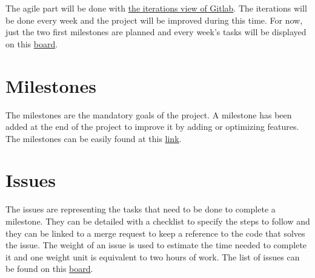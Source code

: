 The agile part will be done with \href{https://gitlab.forge.hefr.ch/ps6-2223-microdoser/ps6-2223-microdoser/-/cadences}{the iterations view of Gitlab}.
The iterations will be done every week and the project will be improved during this time.
For now, just the two first milestones are planned and every week's tasks will be displayed on this \href{https://gitlab.forge.hefr.ch/ps6-2223-microdoser/ps6-2223-microdoser/-/boards/1667?iteration_id=Current}{board}.


\section{Milestones}
\label{sec:planning:milestones}

The milestones are the mandatory goals of the project.
A milestone has been added at the end of the project to improve it by adding or optimizing features.
The milestones can be easily found at this \href{https://gitlab.forge.hefr.ch/ps6-2223-microdoser/ps6-2223-microdoser/-/milestones}{link}.

\section{Issues}
\label{sec:planning:issues}

The issues are representing the tasks that need to be done to complete a milestone.
They can be detailed with a checklist to specify the steps to follow and they can be linked to a merge request to keep a reference to the code that solves the issue.
The weight of an issue is used to estimate the time needed to complete it and one weight unit is equivalent to two hours of work.
The list of issues can be found on this \href{https://gitlab.forge.hefr.ch/ps6-2223-microdoser/ps6-2223-microdoser/-/boards/1658}{board}.

